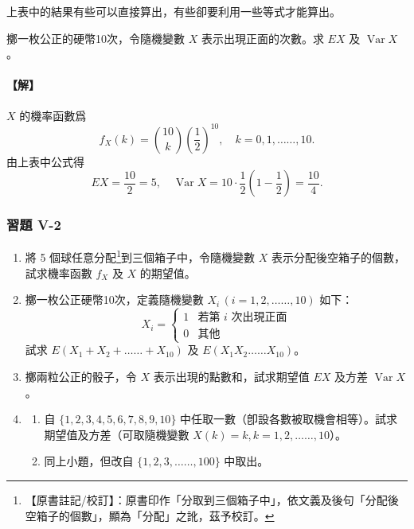上表中的結果有些可以直接算出，有些卻要利用一些等式才能算出。

\medskip
\begin{example}\label{ex:b5-5-15}
擲一枚公正的硬幣10次，令隨機變數 $X$ 表示出現正面的次數。求 $EX$ 及 $\operatorname{Var} X$。
\end{example}
\paragraph{【解】}
$X$ 的機率函數爲
\[
f_X(k) = \binom{10}{k} \left(\frac{1}{2}\right)^{10}, \quad k = 0, 1, \ldots\ldots, 10.
\]
由上表中公式得
\[
EX = \frac{10}{2} = 5, \quad \operatorname{Var} X = 10 \cdot \frac{1}{2}\left(1 - \frac{1}{2}\right) = \frac{10}{4}. \tag*{\#}
\]

\subsubsection*{習題 V-2}

\begin{enumerate}[label=\arabic*., leftmargin=2em, itemsep=0.5em]
  \item 將 5 個球任意分配\label{note:b5-ch5-p160-fenpei}\footnote{【原書註記/校訂】：原書印作「分取到三個箱子中」，依文義及後句「分配後空箱子的個數」，顯為「分配」之訛，茲予校訂。}到三個箱子中，令隨機變數 $X$ 表示分配後空箱子的個數，試求機率函數 $f_X$ 及 $X$ 的期望值。
  \item 擲一枚公正硬幣10次，定義隨機變數 $X_i \, (i = 1, 2, \ldots\ldots, 10)$ 如下：
  \[
  X_i = \begin{cases}
  1 & \text{若第 $i$ 次出現正面} \\
  0 & \text{其他}
  \end{cases}
  \]
  試求 $E(X_1+X_2+\ldots\ldots+X_{10})$ 及 $E(X_1 X_2 \ldots\ldots X_{10})$。
  \item 擲兩粒公正的骰子，令 $X$ 表示出現的點數和，試求期望值 $EX$ 及方差 $\operatorname{Var} X$。
  \item \begin{enumerate}[label=(\arabic*), itemsep=0.3em, topsep=0.2em]
    \item 自 $\{1, 2, 3, 4, 5, 6, 7, 8, 9, 10\}$ 中任取一數（卽設各數被取機會相等）。試求期望值及方差（可取隨機變數 $X(k)=k, k=1, 2, \ldots\ldots, 10$）。
    \item 同上小題，但改自 $\{1, 2, 3, \ldots\ldots, 100\}$ 中取出。
  \end{enumerate}
\end{enumerate}
